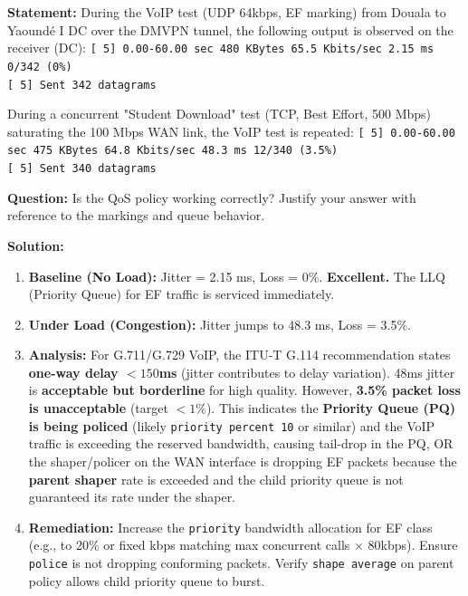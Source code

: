 \documentclass[11pt]{article}
\begin{document}
\begin{exoresolu}
\textbf{Statement:} During the VoIP test (UDP 64kbps, EF marking) from Douala to Yaoundé I DC over the DMVPN tunnel, the following output is observed on the receiver (DC):
\texttt{[  5]   0.00-60.00 sec  480 KBytes  65.5 Kbits/sec  2.15 ms  0/342 (0\%)}\\
\texttt{[  5] Sent 342 datagrams}

During a concurrent "Student Download" test (TCP, Best Effort, 500 Mbps) saturating the 100 Mbps WAN link, the VoIP test is repeated:
\texttt{[  5]   0.00-60.00 sec  475 KBytes  64.8 Kbits/sec  48.3 ms  12/340 (3.5\%)}\\
\texttt{[  5] Sent 340 datagrams}

\textbf{Question:} Is the QoS policy working correctly? Justify your answer with reference to the markings and queue behavior.

\textbf{Solution:}
\begin{enumerate}
    \item \textbf{Baseline (No Load):} Jitter = 2.15 ms, Loss = 0\%. \textbf{Excellent.} The LLQ (Priority Queue) for EF traffic is serviced immediately.
    \item \textbf{Under Load (Congestion):} Jitter jumps to 48.3 ms, Loss = 3.5\%.
    \item \textbf{Analysis:} For G.711/G.729 VoIP, the ITU-T G.114 recommendation states \textbf{one-way delay $< 150$ms} (jitter contributes to delay variation). 48ms jitter is \textbf{acceptable but borderline} for high quality. However, \textbf{3.5\% packet loss is unacceptable} (target $< 1\text{\%}$). This indicates the \textbf{Priority Queue (PQ) is being policed} (likely \texttt{priority percent 10} or similar) and the VoIP traffic is exceeding the reserved bandwidth, causing tail-drop in the PQ, OR the shaper/policer on the WAN interface is dropping EF packets because the \textbf{parent shaper} rate is exceeded and the child priority queue is not guaranteed its rate under the shaper.
    \item \textbf{Remediation:} Increase the \texttt{priority} bandwidth allocation for EF class (e.g., to 20\% or fixed kbps matching max concurrent calls $\times$ 80kbps). Ensure \texttt{police} is not dropping conforming packets. Verify \texttt{shape average} on parent policy allows child priority queue to burst.
\end{enumerate}
\end{exoresolu}
\end{document}
